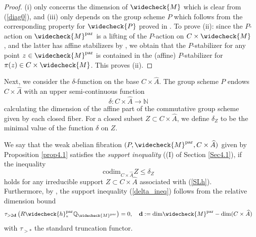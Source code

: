 \documentclass[11pt]{amsart}
\theoremstyle{plain}
\theoremstyle{definition}
\theoremstyle{remark}
\newcommand{\BN}{{\mathbb{N}}}
\newcommand{\BQ}{{\mathbb{Q}}}
\begin{document}
\begin{proof}
    (i) only concerns the dimension of $\widecheck{M}$ which is clear from (\ref{diag0}), and (iii) only depends on the group scheme $P$ which follows from the corresponding property for $\widecheck{P}$ proved in \cite[Theorem 4.7.2]{dC_SL}. To prove (ii): since the $P$-action on $\widecheck{M}^{\mathrm{par}}$ is a lifting of the $P$-action on $C\times \widecheck{M}$, and the latter has affine stabilizers by \cite{dC_SL}, we obtain that the $P$-stabilizer for any point $z \in \widecheck{M}^{\mathrm{par}}$ is contained in the (affine) $P$-stabilizer for $\pi(z) \in C \times \widecheck{M}$. This proves (ii).
\end{proof}



Next, we consider the $\delta$-function on the base $C\times \widehat{A}$. The group scheme $P$ endows $C\times \widehat{A}$ with an upper semi-continuous function
\[
\delta: C\times \widehat{A} \to \BN
\]
calculating the dimension of the affine part of the commutative group scheme given by each closed fiber. For a closed subset $Z\subset C\times \widehat{A}$, we define $\delta_Z$ to be the minimal value of the function $\delta$ on $Z$. 

We say that the weak abelian fibration  $(P, \widecheck{M}^{\mathrm{par}}, C\times \widehat{A})$ given by Proposition \ref{prop4.1} satisfies the \emph{support inequality} ((I) of Section \ref{Sec4.1}), if the inequality
\begin{equation}\label{delta_ineq}
\mathrm{codim}_{C\times \widehat{A}}Z \leq \delta_Z
\end{equation}
holds for any irreducible support $Z \subset C\times \widehat{A}$ associated with (\ref{SLh}). Furthermore, by \cite[Theorem 1.8]{MS2}, the support inequality (\ref{delta_ineq}) follows from the relative dimension bound
\begin{equation}\label{relative}
   \tau_{> 2\mathbf{d}}\left( R\widecheck{h}^{\mathrm{par}}_* \BQ_{\widecheck{M}^{\mathrm{par}}}\right) = 0, \quad \mathbf{d}: = \mathrm{dim} \widecheck{M}^{\mathrm{par}} - \mathrm{dim} (C\times \widehat{A})
\end{equation}
with $\tau_{>*}$ the standard truncation functor. 
\end{document}
